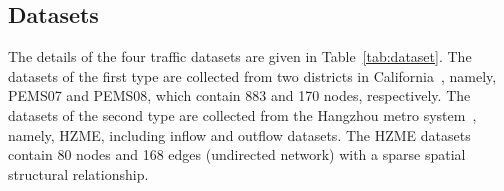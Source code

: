 \documentclass[sn-mathphys,iicol]{sn-jnl}
\newcommand\tabref[1]{Table~\ref{#1}}
\theoremstyle{thmstyleone}\newtheorem{theorem}{Theorem}\newtheorem{proposition}[theorem]{Proposition}
\theoremstyle{thmstyletwo}\newtheorem{example}{Example}\newtheorem{remark}{Remark}
\theoremstyle{thmstylethree}\newtheorem{definition}{Definition}
\begin{document}
\subsection{Datasets}
\label{sec:datasets}
The details of the four traffic datasets are given in \tabref{tab:dataset}. The datasets of the first type are collected from two districts in California~\cite{Chen.2001}, namely, PEMS07 and PEMS08, which contain 883 and 170 nodes, respectively. The datasets of the second type are collected from the Hangzhou metro system~\cite{Guo.2021}, namely, HZME, including inflow and outflow datasets. The HZME datasets contain 80 nodes and 168 edges (undirected network) with a sparse spatial structural relationship.
\begin{table}[!h]
    \centering
    \caption{Datasets description.}
    \label{tab:dataset}
\end{table}
\end{document}
